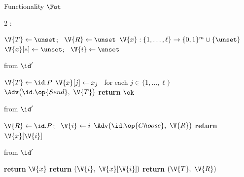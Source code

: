 \begin{interface}[nofloat]{Functionality $\Fot$ \\
}

{\scriptsize
\setlength{\columnsep}{1.4em}
\begin{multicols}{2}
:
\begin{algorithmic}[1]
\setcounter{contline}{0}\algcont
\State $\V{T} \gets \unset$; \ $\V{R} \gets \unset$
\State $\V{x} : \{1,\ldots,\ell\} \to \{0,1\}^{m} \cup \{\unset\}$
\State $\V{x}[*] \gets \unset$; \ $\V{i} \gets \unset$
\algsave
\end{algorithmic}
\vspace{1.4ex}

 \quad from $\id'$
\begin{algorithmic}[1]
\algcont
{}
\State $\V{T} \gets \id.P$
\State $\V{x}[j] \gets x_j$ \ for each $j \in \{1,\ldots,\ell\}$
\State $\Adv\bigl(\id.\op{Send},\ \V{T}\bigr)$ \label{ln:otsendleak}
\State \textbf{return} $\ok$
\algsave
\end{algorithmic}
\vspace{1.4ex}

\columnbreak

 \quad from $\id'$
\begin{algorithmic}[1]
\algcont
{} \label{ln:otloaded}
\State $\V{R} \gets \id.P$; \ $\V{i} \gets i$
\State $\Adv\bigl(\id.\op{Choose},\ \V{R}\bigr)$ \label{ln:otchooseleak}
\State \textbf{return} $\V{x}[\V{i}]$ \label{ln:otone}
\algsave
\end{algorithmic}
\vspace{1.4ex}

 \quad from $\id'$
\begin{algorithmic}[1]
\algcont
{}
  \State \textbf{return} $\V{x}$
\EndIf
{}
  \State \textbf{return} $(\V{i},\ \V{x}[\V{i}])$
\EndIf
\State \textbf{return} $(\V{T},\ \V{R})$ \label{ln:otoutsider}
\algsave
\end{algorithmic}
\end{multicols}}
\end{interface}
